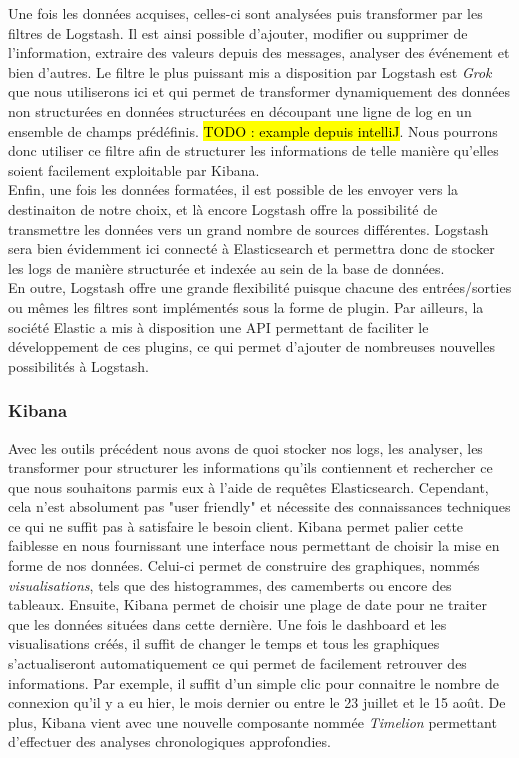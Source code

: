 	Une fois les données acquises, celles-ci sont analysées puis transformer par les filtres de Logstash. Il est ainsi possible d'ajouter, modifier ou supprimer de l'information, extraire des valeurs depuis des messages, analyser des événement et bien d'autres. Le filtre le plus puissant mis a disposition par Logstash est \textit{Grok} que nous utiliserons ici et qui permet de transformer dynamiquement des données non structurées en données structurées en découpant une ligne de log en un ensemble de champs prédéfinis. \hl{TODO : example depuis intelliJ}. Nous pourrons donc utiliser ce filtre afin de structurer les informations de telle manière qu'elles soient facilement exploitable par Kibana. \\
	
	Enfin, une fois les données formatées, il est possible de les envoyer vers la destinaiton de notre choix, et là encore Logstash offre la possibilité de transmettre les données vers un grand nombre de sources différentes. Logstash sera bien évidemment ici connecté à Elasticsearch et permettra donc de stocker les logs de manière structurée et indexée au sein de la base de données. \\
	
	En outre, Logstash offre une grande flexibilité puisque chacune des entrées/sorties ou mêmes les filtres sont implémentés sous la forme de plugin. Par ailleurs, la société Elastic a mis à disposition une API permettant de faciliter le développement de ces plugins, ce qui permet d'ajouter de nombreuses nouvelles possibilités à Logstash.
	
	\subsubsection{Kibana}
	Avec les outils précédent nous avons de quoi stocker nos logs, les analyser, les transformer pour structurer les informations qu'ils contiennent et rechercher ce que nous souhaitons parmis eux à l'aide de requêtes Elasticsearch. Cependant, cela n'est absolument pas "user friendly" et nécessite des connaissances techniques ce qui ne suffit pas à satisfaire le besoin client. Kibana permet palier cette faiblesse en nous fournissant une interface nous permettant de choisir la mise en forme de nos données. Celui-ci permet de construire des graphiques, nommés \textit{visualisations}, tels que des histogrammes, des camemberts ou encore des tableaux. Ensuite, Kibana permet de choisir une plage de date pour ne traiter que les données situées dans cette dernière. Une fois le dashboard et les visualisations créés, il suffit de changer le temps et tous les graphiques s'actualiseront automatiquement ce qui permet de facilement retrouver des informations. Par exemple, il suffit d'un simple clic pour connaitre le nombre de connexion qu'il y a eu hier, le mois dernier ou entre le 23 juillet et le 15 août. De plus, Kibana vient avec une nouvelle composante nommée \textit{Timelion} permettant d'effectuer des analyses chronologiques approfondies. \\
	
